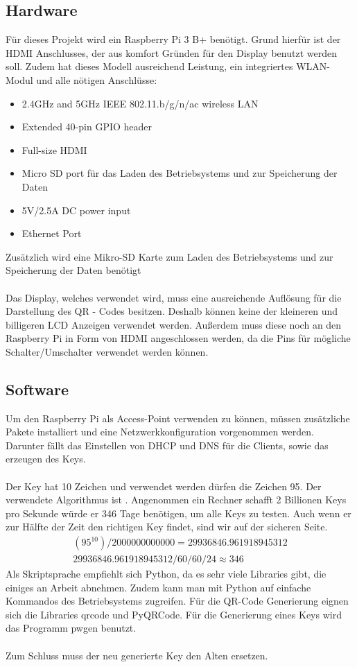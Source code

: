 \documentclass[a4paper,11pt,singlespacing]{article}
\begin{document}
		\subsection{Hardware}
		Für dieses Projekt wird ein Raspberry Pi 3 B+ benötigt. Grund hierfür ist der HDMI Anschlusses, der aus komfort Gründen für den Display benutzt werden soll. Zudem hat dieses Modell ausreichend Leistung, ein integriertes WLAN-Modul und alle nötigen Anschlüsse:
		\begin{itemize}
			\item 2.4GHz and 5GHz IEEE 802.11.b/g/n/ac wireless LAN
			\item Extended 40-pin GPIO header
			\item Full-size HDMI
			\item Micro SD port für das Laden des Betriebsystems und zur Speicherung der Daten
			\item 5V/2.5A DC power input
			\item Ethernet Port
		\end{itemize}
		Zusätzlich wird eine Mikro-SD Karte zum Laden des Betriebsystems und zur Speicherung der Daten benötigt \\ \\
		Das Display, welches verwendet wird, muss eine ausreichende Auflösung für die Darstellung des QR - Codes besitzen. Deshalb können keine der kleineren und billigeren LCD Anzeigen verwendet werden. Außerdem muss diese noch an den Raspberry Pi in Form von HDMI angeschlossen werden, da die Pins für mögliche Schalter/Umschalter verwendet werden können.
		
		\subsection{Software}
		Um den Raspberry Pi als Access-Point verwenden zu können, müssen zusätzliche Pakete installiert und eine Netzwerkkonfiguration vorgenommen werden. Darunter fällt das Einstellen von DHCP und DNS für die Clients, sowie das erzeugen des Keys. \\ \\
		Der Key hat 10 Zeichen und verwendet werden dürfen die Zeichen 95. Der verwendete Algorithmus ist . Angenommen ein Rechner schafft 2 Billionen Keys pro Sekunde würde er 346 Tage benötigen, um alle Keys zu testen. Auch wenn er zur Hälfte der Zeit den richtigen Key findet, sind wir auf der sicheren Seite. 
		\begin{eqnarray}
			(95^{10})/2000000000000 =  29936846.961918945312\\
			29936846.961918945312 / 60 /60 /24 \approx 346
		\end{eqnarray}
		Als Skriptsprache empfiehlt sich Python, da es sehr viele Libraries gibt, die einiges an Arbeit abnehmen. Zudem kann man mit Python auf einfache Kommandos des Betriebsystems zugreifen. Für die QR-Code Generierung eignen sich die Libraries qrcode und PyQRCode. Für die Generierung eines Keys wird das Programm pwgen benutzt.\\ \\
		Zum Schluss muss der neu generierte Key den Alten ersetzen.
		
\end{document}
